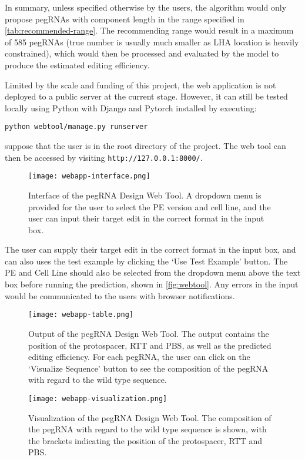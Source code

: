 In summary, unless specified otherwise by the users, the algorithm would only propose pegRNAs with component length in the range specified in \autoref{tab:recommended-range}. The recommending range would result in a maximum of 585 pegRNAs (true number is usually much smaller as LHA location is heavily constrained), which would then be processed and evaluated by the model to produce the estimated editing efficiency.


Limited by the scale and funding of this project, the web application is not deployed to a public server at the current stage. However, it can still be tested locally using Python with Django and Pytorch installed by executing:

\verb|python webtool/manage.py runserver|

suppose that the user is in the root directory of the project. The web tool can then be accessed by visiting \verb|http://127.0.0.1:8000/|.

\begin{figure}
    \centering
    \texttt{[image: webapp-interface.png]}
    \caption[pegRNA Design Web Tool Interface]{Interface of the pegRNA Design Web Tool. A dropdown menu is provided for the user to select the PE version and cell line, and the user can input their target edit in the correct format in the input box.}
    \label{fig:webtool}
\end{figure}

The user can supply their target edit in the correct format in the input box, and can also uses the test example by clicking the `Use Test Example' button. The PE and Cell Line should also be selected from the dropdown menu above the text box before running the prediction, shown in \autoref{fig:webtool}. Any errors in the input would be communicated to the users with browser notifications. 

\begin{figure}
    \centering
    \texttt{[image: webapp-table.png]}
    \caption[pegRNA Design Web Tool Output]{Output of the pegRNA Design Web Tool. The output contains the position of the protospacer, RTT and PBS, as well as the predicted editing efficiency. For each pegRNA, the user can click on the `Visualize Sequence' button to see the composition of the pegRNA with regard to the wild type sequence.}
    \label{fig:webtool-output}
\end{figure}

\begin{figure}
    \centering
    \texttt{[image: webapp-visualization.png]}
    \caption[pegRNA Design Web Tool Visualization]{Visualization of the pegRNA Design Web Tool. The composition of the pegRNA with regard to the wild type sequence is shown, with the brackets indicating the position of the protospacer, RTT and PBS.}
    \label{fig:webtool-visualize}
\end{figure}

